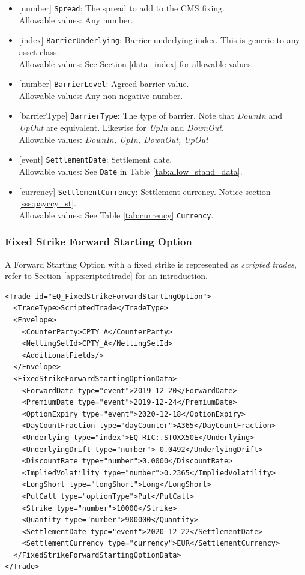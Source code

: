 \begin{itemize}
  \item{}[number] \lstinline!Spread!: The spread to add to the CMS fixing.\\
  Allowable values: Any number.
  \item{}[index] \lstinline!BarrierUnderlying!: Barrier underlying index. This is generic to any asset class. \\
  Allowable values: See Section \ref{data_index} for allowable values.
  \item{}[number] \lstinline!BarrierLevel!: Agreed barrier value. \\
  Allowable values: Any non-negative number.
  \item{}[barrierType] \lstinline!BarrierType!: The type of barrier. Note that \emph{DownIn} and
  \emph{UpOut} are equivalent. Likewise for \emph{UpIn} and \emph{DownOut}. \\
  Allowable values: \emph{DownIn, UpIn, DownOut, UpOut}
  \item{}[event] \lstinline!SettlementDate!: Settlement date. \\
  Allowable values: See \lstinline!Date! in Table \ref{tab:allow_stand_data}.
  \item{}[currency] \lstinline!SettlementCurrency!: Settlement currency. Notice section \ref{sss:payccy_st}. \\
  Allowable values: See Table \ref{tab:currency} \lstinline!Currency!.
\end{itemize}

\subsubsection{Fixed Strike Forward Starting Option}


A Forward Starting Option with a fixed strike is represented as {\em scripted trades}, refer to Section
\ref{app:scriptedtrade} for an introduction.

\begin{verbatim}
<Trade id="EQ_FixedStrikeForwardStartingOption">
  <TradeType>ScriptedTrade</TradeType>
  <Envelope>
    <CounterParty>CPTY_A</CounterParty>
    <NettingSetId>CPTY_A</NettingSetId>
    <AdditionalFields/>
  </Envelope>
  <FixedStrikeForwardStartingOptionData>
    <ForwardDate type="event">2019-12-20</ForwardDate>
    <PremiumDate type="event">2019-12-24</PremiumDate>
    <OptionExpiry type="event">2020-12-18</OptionExpiry>
    <DayCountFraction type="dayCounter">A365</DayCountFraction>
    <Underlying type="index">EQ-RIC:.STOXX50E</Underlying>
    <UnderlyingDrift type="number">-0.0492</UnderlyingDrift>
    <DiscountRate type="number">0.0000</DiscountRate>
    <ImpliedVolatility type="number">0.2365</ImpliedVolatility>
    <LongShort type="longShort">Long</LongShort>
    <PutCall type="optionType">Put</PutCall>
    <Strike type="number">10000</Strike>
    <Quantity type="number">900000</Quantity>
    <SettlementDate type="event">2020-12-22</SettlementDate>
    <SettlementCurrency type="currency">EUR</SettlementCurrency>
  </FixedStrikeForwardStartingOptionData>
</Trade>
\end{verbatim}

